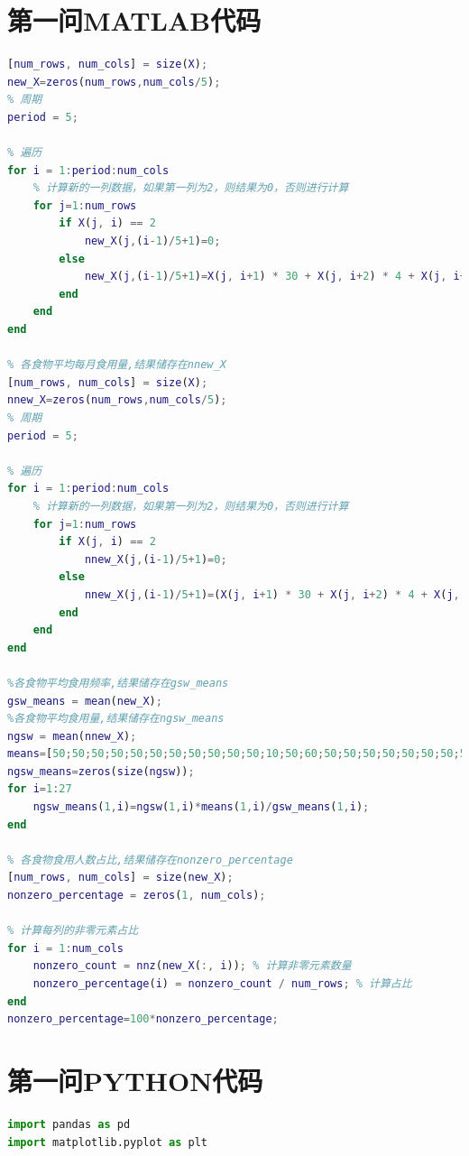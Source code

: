 \documentclass{cumcmthesis}
\begin{document}
\newpage
\begin{appendices}
\begin{lstlisting}[language=html]

\end{lstlisting}
\section{第一问MATLAB代码}
\begin{lstlisting}[language=matlab]% 全部转化为食物次数/月,结果储存在new_X
% load('X.mat')
[num_rows, num_cols] = size(X);
new_X=zeros(num_rows,num_cols/5);
% 周期
period = 5;

% 遍历
for i = 1:period:num_cols
    % 计算新的一列数据，如果第一列为2，则结果为0，否则进行计算
    for j=1:num_rows 
        if X(j, i) == 2
            new_X(j,(i-1)/5+1)=0;
        else 
            new_X(j,(i-1)/5+1)=X(j, i+1) * 30 + X(j, i+2) * 4 + X(j, i+3);
        end
    end
end

% 各食物平均每月食用量,结果储存在nnew_X
[num_rows, num_cols] = size(X);
nnew_X=zeros(num_rows,num_cols/5);
% 周期
period = 5;

% 遍历
for i = 1:period:num_cols
    % 计算新的一列数据，如果第一列为2，则结果为0，否则进行计算
    for j=1:num_rows 
        if X(j, i) == 2
            nnew_X(j,(i-1)/5+1)=0;
        else 
            nnew_X(j,(i-1)/5+1)=(X(j, i+1) * 30 + X(j, i+2) * 4 + X(j, i+3))*X(j, i+4);
        end
    end
end

%各食物平均食用频率,结果储存在gsw_means
gsw_means = mean(new_X);
%各食物平均食用量,结果储存在ngsw_means
ngsw = mean(nnew_X);
means=[50;50;50;50;50;50;50;50;50;50;50;10;50;60;50;50;50;50;50;50;50;50;50;50;50;250;250]';
ngsw_means=zeros(size(ngsw));
for i=1:27
    ngsw_means(1,i)=ngsw(1,i)*means(1,i)/gsw_means(1,i);
end

% 各食物食用人数占比,结果储存在nonzero_percentage
[num_rows, num_cols] = size(new_X);
nonzero_percentage = zeros(1, num_cols);

% 计算每列的非零元素占比
for i = 1:num_cols
    nonzero_count = nnz(new_X(:, i)); % 计算非零元素数量
    nonzero_percentage(i) = nonzero_count / num_rows; % 计算占比
end
nonzero_percentage=100*nonzero_percentage;
\end{lstlisting}
\section{第一问PYTHON代码}
\begin{lstlisting}[language=python]import pandas as pd
import matplotlib.pyplot as plt



\end{lstlisting}
\end{appendices}
\end{document}
